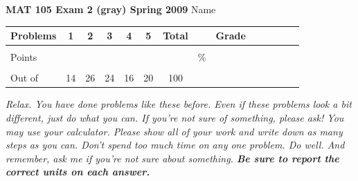 \documentclass[12pt]{article}
\begin{document}
\textbf{MAT 105 Exam 2 (gray) Spring 2009} \hspace{.4in} {\large Name} \hrulefill

\begin{center}

\begin{tabular}
{|l|c|c|c|c|c|c|c|c|c|c|c|c|c|} \hline

 Problems & \hspace{5 pt} 1 \hspace{5 pt}  & \hspace{5 pt} 2 \hspace{5 pt} & \hspace{5 pt} 3  \hspace{5 pt} & \hspace{5 pt} 4  \hspace{5 pt} & \hspace{5 pt}5 \hspace{5 pt} & \hspace{5 pt} Total  \hspace{5 pt} & &  \hspace{5 pt} Grade \hspace{5 pt}  \\ \hline
&&&&&&&&\\  
Points &&&&&&&    \hspace{.8in}\% &  \\ 
&&&&&&&& \\  \hline
Out of & 14 & 26 & 24  & 16 & 20 &100 & & \\ \hline

\end {tabular}

\end{center}

\vspace{.2in}

 \emph{Relax.  You have done problems like these before.  Even if these problems look a bit different, just do what you can.  If you're not sure of something, please ask! You may use your calculator.  Please show all of your work and write down as many steps as you can.  Don't spend too much time on any one problem.  Do well.  And remember, ask me if you're not sure about something.  \textbf{Be sure to report the correct units on each answer.}}

\hrulefill
\end{document}
